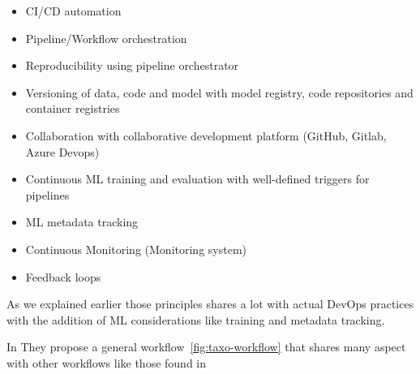 \begin{itemize}
    \item CI/CD automation
    \item Pipeline/Workflow orchestration
    \item Reproducibility using pipeline orchestrator
    \item Versioning of data, code and model with model registry, code repositories and container registries
    \item Collaboration with collaborative development platform (GitHub, Gitlab, Azure Devops)
    \item Continuous ML training and evaluation with well-defined triggers for pipelines
    \item ML metadata tracking
    \item Continuous Monitoring (Monitoring system)
    \item Feedback loops
\end{itemize}

As we explained earlier those principles shares a lot with actual DevOps practices with the addition of ML considerations
like training and metadata tracking.

In\cite{9792270} They propose a general workflow~\ref{fig:taxo-workflow} that shares many aspect with other workflows like those found in\cite{treveil2020introducing,gift2021practical}

